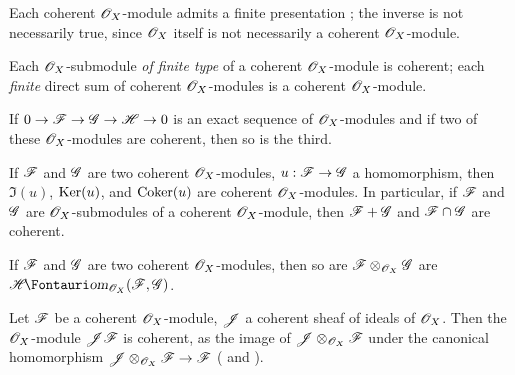 \begin{env}[5.3.2]
\label{0.5.3.2}
Each coherent $\mathscr{O}_X$-module admits a finite presentation ;
the inverse is not necessarily true, since $\mathscr{O}_X$ itself is not necessarily a coherent $\mathscr{O}_X$-module.

Each $\mathscr{O}_X$-submodule \emph{of finite type} of a coherent $\mathscr{O}_X$-module is coherent;
each \emph{finite} direct sum of coherent $\mathscr{O}_X$-modules is a coherent $\mathscr{O}_X$-module.
\end{env}

\begin{env}[5.3.3]
\label{0.5.3.3}
If $0\to\sh{F}\to\sh{G}\to\sh{H}\to 0$ is an exact sequence of $\mathscr{O}_X$-modules and if two of these $\mathscr{O}_X$-modules are coherent, then so is the third.
\end{env}

\begin{env}[5.3.4]
\label{0.5.3.4}
If $\mathscr{F}$ and $\mathscr{G}$ are two coherent $\mathscr{O}_X$-modules, $u:\sh{F}\to\sh{G}$ a homomorphism, then $\Im(u)$, $\operatorname{Ker}(u)$, and $\operatorname{Coker}(u)$ are coherent $\mathscr{O}_X$-modules.
In particular, if $\mathscr{F}$ and $\mathscr{G}$ are $\mathscr{O}_X$-submodules of a coherent $\mathscr{O}_X$-module, then $\mathscr{F}+\mathscr{G}$ and $\mathscr{F}\cap\mathscr{G}$ are coherent.

\end{env}

\begin{env}[5.3.5]
\label{0.5.3.5}
If $\mathscr{F}$ and $\mathscr{G}$ are two coherent $\mathscr{O}_X$-modules, then so are $\mathscr{F}\otimes_{\mathscr{O}_X}\mathscr{G}$ are $\shHom_{\sh{O}_X}(\sh{F},\sh{G})$.
\end{env}

\begin{env}[5.3.6]
\label{0.5.3.6}
Let $\mathscr{F}$ be a coherent $\mathscr{O}_X$-module, $\mathscr{J}$ a coherent sheaf of ideals of $\mathscr{O}_X$.
Then the $\mathscr{O}_X$-module $\mathscr{J}\mathscr{F}$ is coherent, as the image of $\mathscr{J}\otimes_{\mathscr{O}_X}\mathscr{F}$ under the canonical homomorphism $\sh{J}\otimes_{\sh{O}_X}\sh{F}\to\sh{F}$ ( and ).
\end{env}


